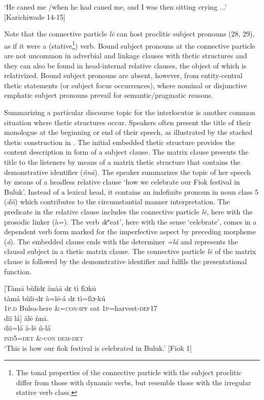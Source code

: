 \documentclass[output=paper]{langsci/langscibook}
\begin{document}
\glt ‘He caned me /when he had caned me, and I was then sitting crying ...’ [Karichiwade 14-15]
\z

Note that the connective particle \textit{l\={e}} can host proclitic subject pronouns (28, 29), as if it were a (stative\footnote{The tonal properties of the connective particle with the subject proclitic differ from those with dynamic verbs, but resemble those with the irregular stative verb class.}) verb. Bound subject pronouns at the connective particle are not uncommon in adverbial and linkage clauses with thetic structures and they can also be found in head-internal relative clauses, the object of which is relativized. Bound subject pronouns are absent, however, from entity-central thetic statements (or subject focus occurrences), where nominal or disjunctive emphatic subject pronouns prevail for semantic/pragmatic reasons.

Summarizing a particular discourse topic for the interlocutor is another common situation where thetic structures occur. Speakers often present the title of their monologue at the beginning or end of their speech, as illustrated by the stacked thetic construction in . The initial embedded thetic structure provides the content description in form of a subject clause. The matrix clause presents the title to the listeners by means of a matrix thetic structure that contains the demonstrative identifier (\textit{ǹn\={a}}). The speaker summarizes the topic of her speech by means of a headless relative clause ‘how we celebrate our Fiok festival in Buluk’. Instead of a lexical head, it contains an indefinite pronoun in noun class 5 (\textit{d\={i}\={i}}) which contributes to the circumstantial manner interpretation. The predicate in the relative clause includes the connective particle \textit{l\={e}}, here with the prosodic linker (à=). The verb \textit{d\={ɛ}}‘eat’, here with the sense ‘celebrate’, comes in a dependent verb form marked for the imperfective aspect by preceding morpheme (\textit{á}). The embedded clause ends with the determiner \textit{=lá} and represents the clausal subject in a thetic matrix clause. The connective particle \textit{l\={e}} of the matrix clause is followed by the demonstrative identifier and fulfils the presentational function.

\ea\label{ex:schwarz:30}
\glll   \textup{[}Tàm\={a}  bùlìdɛ    ànà\={a}    dɛ  tì   fìɔk\={u}\\
     \textup{tàmá}  bùli-dɛ    à=l\={e}-á    dɛ  {tì=fìɔ}\textup{-kú}\\
       1\textsc{p}.\textsc{d}  Bulsa-here      \&=\textsc{con}-\textsc{ipf}    eat  1\textsc{p}=harvest-\textsc{def}17  \\
\glll   d\={i}\={i}  lá\textup{] } àl\={e}    ǹn\={a}.\\
    \textup{d\={i}i=lá    à-l\={e}    ǹ-lá}\\
     \textsc{  ind5=det     \&-con    dem-det}\\
\glt ‘This is how our fiok festival is celebrated in Buluk.’ [Fiok 1]
\z
\end{document}
